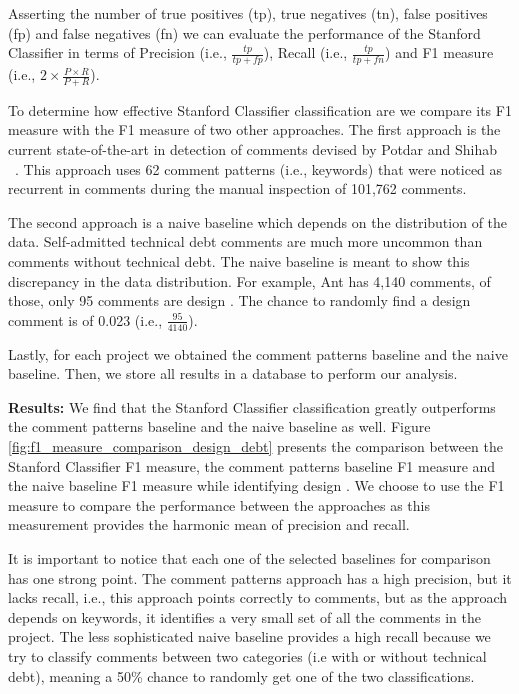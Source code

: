 Asserting the number of true positives (tp), true negatives (tn), false positives (fp) and false negatives (fn) we can evaluate the performance of the Stanford Classifier in terms of Precision (i.e., $\frac{tp}{tp + fp}$), Recall (i.e., $\frac{tp}{tp + fn}$) and F1 measure (i.e., $2 \times \frac{P \times R}{P + R}$).

To determine how effective Stanford Classifier classification are we compare its F1 measure with the F1 measure of two other approaches. The first approach is the current state-of-the-art in detection of \SATD comments devised by Potdar and Shihab ~\cite{Potdar2014ICSME}. This approach uses 62 comment patterns (i.e., keywords) that were noticed as recurrent in \SATD comments during the manual inspection of 101,762 comments. 

The second approach is a naive baseline which depends on the distribution of the data. Self-admitted technical debt comments are much more uncommon than comments without technical debt. The naive baseline is meant to show this discrepancy in the data distribution. For example, Ant has 4,140 comments, of those, only 95 comments are design \SATD. The chance to randomly find a design \SATD comment is of 0.023 (i.e., $\frac{95}{4140}$). 

Lastly, for each project we obtained the comment patterns baseline and the naive baseline. Then, we store all results in a database to perform our analysis. 

\vspace{1mm}

\noindent \textbf{Results:} We find that the Stanford Classifier classification greatly outperforms the comment patterns baseline and the naive baseline as well. Figure \ref{fig:f1_measure_comparison_design_debt} presents the comparison between the Stanford Classifier F1 measure, the comment patterns baseline F1 measure and the naive baseline F1 measure while identifying design \SATD. We choose to use the F1 measure to compare the performance between the approaches as this measurement provides the harmonic mean of precision and recall.

It is important to notice that each one of the selected baselines for comparison has one strong point. The comment patterns approach has a high precision, but it lacks recall, i.e., this approach points correctly to \SATD comments, but as the approach depends on keywords, it identifies a very small set of all the \SATD comments in the project. The less sophisticated naive baseline provides a high recall because we try to classify comments between two categories (i.e with or without technical debt), meaning a 50\% chance to randomly get one of the two classifications. 

